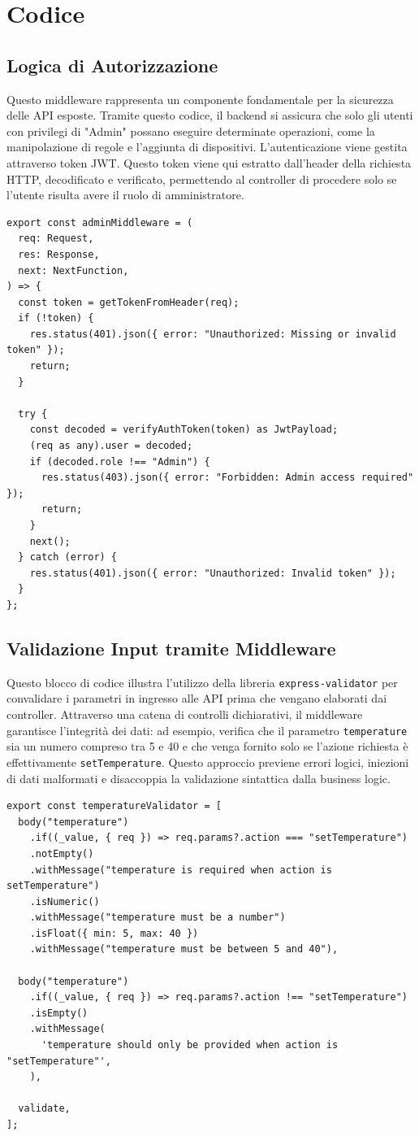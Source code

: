 \documentclass[a4paper,12pt]{article}
\begin{document}
\newpage
\section{Codice}

\subsection{Logica di Autorizzazione}
Questo middleware rappresenta un componente fondamentale per la sicurezza delle API esposte. Tramite questo codice, il backend si assicura che solo gli utenti con privilegi di "Admin" possano eseguire determinate operazioni, come la manipolazione di regole e l'aggiunta di dispositivi. L'autenticazione viene gestita attraverso token JWT. Questo token viene qui estratto dall'header della richiesta HTTP, decodificato e verificato, permettendo al controller di procedere solo se l'utente risulta avere il ruolo di amministratore.
\begin{lstlisting}
export const adminMiddleware = (
  req: Request,
  res: Response,
  next: NextFunction,
) => {
  const token = getTokenFromHeader(req);
  if (!token) {
    res.status(401).json({ error: "Unauthorized: Missing or invalid token" });
    return;
  }

  try {
    const decoded = verifyAuthToken(token) as JwtPayload;
    (req as any).user = decoded;
    if (decoded.role !== "Admin") {
      res.status(403).json({ error: "Forbidden: Admin access required" });
      return;
    }
    next();
  } catch (error) {
    res.status(401).json({ error: "Unauthorized: Invalid token" });
  }
};
\end{lstlisting}

\subsection{Validazione Input tramite Middleware}
Questo blocco di codice illustra l'utilizzo della libreria \texttt{express-validator} per convalidare i parametri in ingresso alle API prima che vengano elaborati dai controller. Attraverso una catena di controlli dichiarativi, il middleware garantisce l'integrità dei dati: ad esempio, verifica che il parametro \texttt{temperature} sia un numero compreso tra 5 e 40 e che venga fornito solo se l'azione richiesta è effettivamente \texttt{setTemperature}. Questo approccio previene errori logici, iniezioni di dati malformati e disaccoppia la validazione sintattica dalla business logic.
\begin{lstlisting}
export const temperatureValidator = [
  body("temperature")
    .if((_value, { req }) => req.params?.action === "setTemperature")
    .notEmpty()
    .withMessage("temperature is required when action is setTemperature")
    .isNumeric()
    .withMessage("temperature must be a number")
    .isFloat({ min: 5, max: 40 })
    .withMessage("temperature must be between 5 and 40"),

  body("temperature")
    .if((_value, { req }) => req.params?.action !== "setTemperature")
    .isEmpty()
    .withMessage(
      'temperature should only be provided when action is "setTemperature"',
    ),

  validate,
];
\end{lstlisting}
\end{document}
